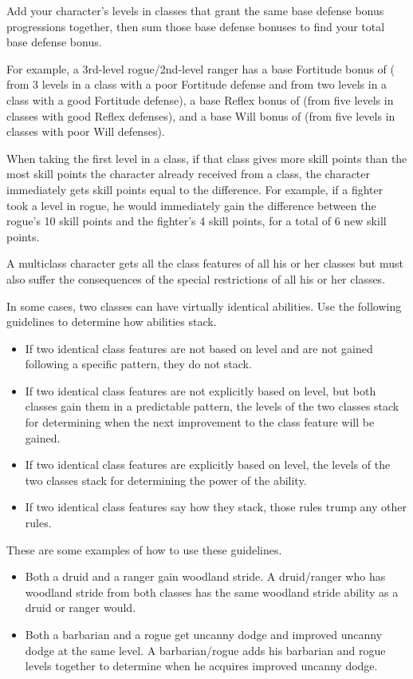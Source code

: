 Add your character's levels in classes that grant the same base defense bonus progressions together, then sum those base defense bonuses to find your total base defense bonus.

\par For example, a 3rd-level rogue/2nd-level ranger has a base Fortitude bonus of  ( from 3 levels in a class with a poor Fortitude defense and  from two levels in a class with a good Fortitude defense), a base Reflex bonus of  (from five levels in classes with good Reflex defenses), and a base Will bonus of  (from five levels in classes with poor Will defenses).

When taking the first level in a class, if that class gives more skill points than the most skill points the character already received from a class, the character immediately gets skill points equal to the difference.
For example, if a fighter took a level in rogue, he would immediately gain the difference between the rogue's 10 skill points and the fighter's 4 skill points, for a total of 6 new skill points.

A multiclass character gets all the class features
of all his or her classes but must also suffer the consequences of the
special restrictions of all his or her classes.

\par In some cases, two classes can have virtually identical abilities.
Use the following guidelines to determine how abilities stack.
\begin{itemize}
    \item If two identical class features are not based on level and are not gained following a specific pattern, they do not stack.
    \item If two identical class features are not explicitly based on level, but both classes gain them in a predictable pattern, the levels of the two classes stack for determining when the next improvement to the class feature will be gained.
    \item If two identical class features are explicitly based on level, the levels of the two classes stack for determining the power of the ability.
    \item If two identical class features say how they stack, those rules trump any other rules.
\end{itemize}
These are some examples of how to use these guidelines.
\begin{itemize}
    \item Both a druid and a ranger gain woodland stride.
        A druid/ranger who has woodland stride from both classes has the same woodland stride ability as a druid or ranger would.
    \item Both a barbarian and a rogue get uncanny dodge and improved uncanny dodge at the same level.
        A barbarian/rogue adds his barbarian and rogue levels together to determine when he acquires improved uncanny dodge.
\end{itemize}

